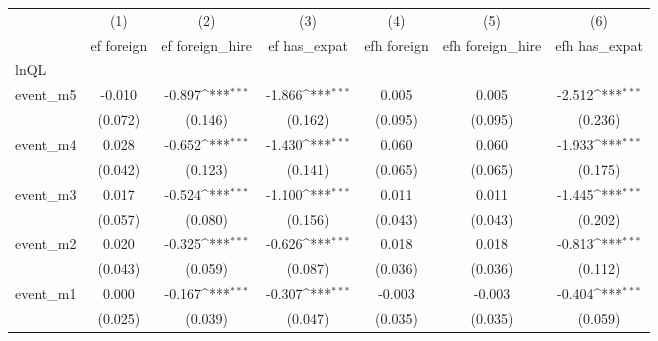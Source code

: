 {
\def\sym#1{\ifmmode^{#1}\else\(^{#1}\)\fi}
\begin{tabular}{l*{6}{c}}
\hline\hline
            &\multicolumn{1}{c}{(1)}&\multicolumn{1}{c}{(2)}&\multicolumn{1}{c}{(3)}&\multicolumn{1}{c}{(4)}&\multicolumn{1}{c}{(5)}&\multicolumn{1}{c}{(6)}\\
            &\multicolumn{1}{c}{ef foreign}&\multicolumn{1}{c}{ef foreign\_hire}&\multicolumn{1}{c}{ef has\_expat}&\multicolumn{1}{c}{efh foreign}&\multicolumn{1}{c}{efh foreign\_hire}&\multicolumn{1}{c}{efh has\_expat}\\
\hline
lnQL        &                     &                     &                     &                     &                     &                     \\
event\_m5    &      -0.010         &      -0.897\sym{***}&      -1.866\sym{***}&       0.005         &       0.005         &      -2.512\sym{***}\\
            &     (0.072)         &     (0.146)         &     (0.162)         &     (0.095)         &     (0.095)         &     (0.236)         \\
[1em]
event\_m4    &       0.028         &      -0.652\sym{***}&      -1.430\sym{***}&       0.060         &       0.060         &      -1.933\sym{***}\\
            &     (0.042)         &     (0.123)         &     (0.141)         &     (0.065)         &     (0.065)         &     (0.175)         \\
[1em]
event\_m3    &       0.017         &      -0.524\sym{***}&      -1.100\sym{***}&       0.011         &       0.011         &      -1.445\sym{***}\\
            &     (0.057)         &     (0.080)         &     (0.156)         &     (0.043)         &     (0.043)         &     (0.202)         \\
[1em]
event\_m2    &       0.020         &      -0.325\sym{***}&      -0.626\sym{***}&       0.018         &       0.018         &      -0.813\sym{***}\\
            &     (0.043)         &     (0.059)         &     (0.087)         &     (0.036)         &     (0.036)         &     (0.112)         \\
[1em]
event\_m1    &       0.000         &      -0.167\sym{***}&      -0.307\sym{***}&      -0.003         &      -0.003         &      -0.404\sym{***}\\
            &     (0.025)         &     (0.039)         &     (0.047)         &     (0.035)         &     (0.035)         &     (0.059)         \\

\end{tabular}}
